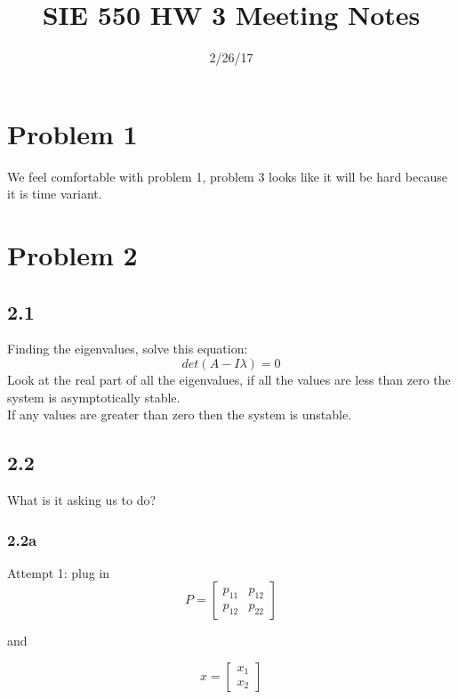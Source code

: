\documentclass[12pt]{article}
\begin{document}
\title{SIE 550 HW 3 Meeting Notes}
\date{2/26/17}

\maketitle

\section{Problem 1} 
We feel comfortable with problem 1, problem 3 looks like it will be hard because it is time variant. 

\section{Problem 2} 
\subsection{2.1}
Finding the eigenvalues, solve this equation:
$$det(A-I\lambda)=0$$
Look at the real part of all the eigenvalues, if all the values are less than zero the system is asymptotically stable.\\
If any values are greater than zero then the system is unstable. 

\subsection{2.2}
What is it asking us to do?

\subsubsection{2.2a}
Attempt 1: plug in 
$$P=\begin{bmatrix} p_{11} & p_{12} \\
p_{12} & p_{22}
\end{bmatrix}$$ 

and 

$$x=\begin{bmatrix} x_{1} \\
x_{2}
\end{bmatrix}$$ 
\end{document}

